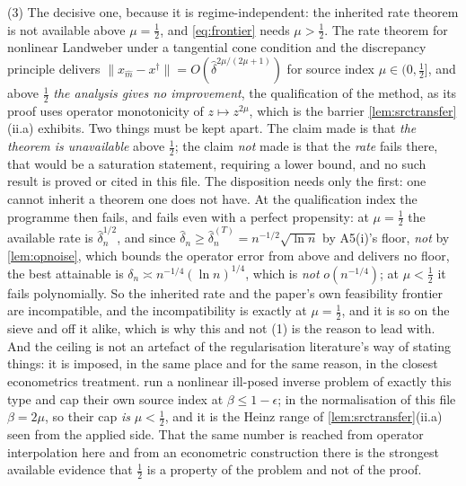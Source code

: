 \begin{remark}
(3) The decisive one, because it is regime-independent: the inherited rate theorem is not
available above $\mu=\tfrac12$, and \eqref{eq:frontier} needs $\mu>\tfrac12$. The rate theorem for
nonlinear Landweber under a tangential cone condition and the discrepancy principle
\citep{hanke1995,engl2000} delivers $\|x_{\hat m}-x^\dagger\|=O(\hat\delta^{2\mu/(2\mu+1)})$ for source
index $\mu\in(0,\tfrac12]$, and above $\tfrac12$ \emph{the analysis gives no improvement}, the
qualification of the method, as its proof uses operator monotonicity of $z\mapsto z^{2\mu}$, which is
the barrier \cref{lem:srctransfer}(ii.a) exhibits.
Two things must be kept apart. The claim made is
that \emph{the theorem is unavailable} above $\tfrac12$; the claim \emph{not} made is that the
\emph{rate} fails there, that would be a saturation statement, requiring a lower bound, and no such
result is proved or cited in this file. The disposition needs only the first: one cannot inherit
a theorem one does not have. At the qualification index the programme then fails, and fails even with
a perfect propensity: at $\mu=\tfrac12$ the available rate is $\hat\delta_n^{1/2}$, and since
$\hat\delta_n\ge\hat\delta_n^{(T)}=n^{-1/2}\sqrt{\ln n}$ by A5(i)'s floor, \emph{not} by
\cref{lem:opnoise}, which bounds the operator error from above and delivers no floor, the best
attainable is $\delta_n\asymp n^{-1/4}(\ln n)^{1/4}$, which is \emph{not} $o(n^{-1/4})$; at
$\mu<\tfrac12$ it fails polynomially. So the inherited rate and the paper's own feasibility
frontier are incompatible, and the incompatibility is exactly at $\mu=\tfrac12$, and it is so on the
sieve and off it alike, which is why this and not (1) is the reason to lead with.
And the ceiling is not an artefact of the regularisation literature's way of stating things: it is
imposed, in the same place and for the same reason, in the closest econometrics treatment.
\citet{centorrinofeveflorens2019} run a nonlinear ill-posed inverse problem of exactly this type and cap
their own source index at $\beta\le1-\epsilon$; in the normalisation of this file $\beta=2\mu$, so their cap
\emph{is} $\mu<\tfrac12$, and it is the Heinz range of \cref{lem:srctransfer}(ii.a) seen from the applied
side. That the same number is reached from operator interpolation here and from an econometric
construction there is the strongest available evidence that $\tfrac12$ is a property of the problem and not
of the proof.


\end{remark}
